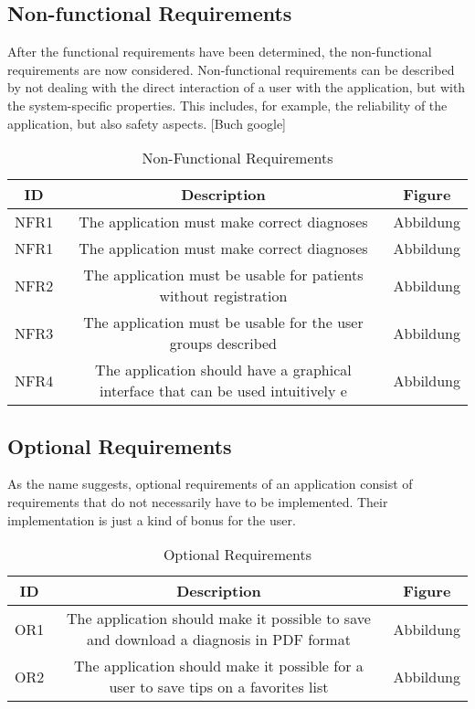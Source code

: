 \subsection{Non-functional Requirements}
After the functional requirements have been determined, the non-functional requirements are now considered. Non-functional requirements can be described by not dealing with the direct interaction of a user with the application, but with the system-specific properties. This includes, for example, the reliability of the application, but also safety aspects. [Buch google]

\begin{table}[H]
	\begin{center}
		\scriptsize
		\def\arraystretch{2}%
		\begin{tabularx}{\textwidth}{ c|c|c }
			\hline
			ID & Description & Figure \\
			\hline
			NFR1 & The application must make correct diagnoses & Abbildung \\
			\hline
			NFR1 & The application must make correct diagnoses & Abbildung \\
			\hline
			NFR2 & The application must be usable for patients without registration & Abbildung \\
			\hline
			NFR3 & The application must be usable for the user groups described & Abbildung \\
			\hline
			NFR4 & The application should have a graphical interface that can be used intuitively e & Abbildung \\
			\hline	
		\end{tabularx}
		\normalsize
	\end{center}
	\caption{Non-Functional Requirements}
\end{table}



\subsection{Optional Requirements}
As the name suggests, optional requirements of an application consist of requirements that do not necessarily have to be implemented. Their implementation is just a kind of bonus for the user.
\begin{table}[H]
	\begin{center}
		\scriptsize
		\def\arraystretch{2}%
		\begin{tabularx}{\textwidth}{ c|c|c }
			\hline
			ID & Description & Figure \\
			\hline
			OR1 & The application should make it possible to save and download a diagnosis in PDF format & Abbildung \\
			\hline
			OR2 & The application should make it possible for a user to save tips on a favorites list & Abbildung \\
			\hline	
		\end{tabularx}
		\normalsize
	\end{center}
	\caption{Optional Requirements}
\end{table}


